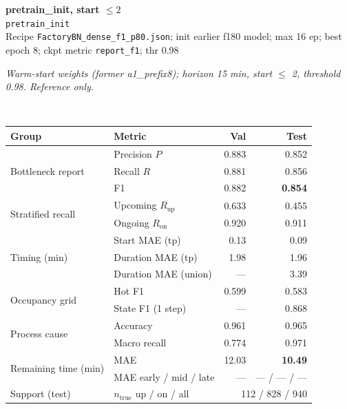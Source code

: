 \documentclass[9pt,a4paper,twocolumn]{extarticle}
\begin{document}
\noindent\begin{minipage}{\columnwidth}
\begin{center}
{\small\bfseries pretrain\_init, start $\le 2$}\\
{\scriptsize\texttt{pretrain\_init}}\\
{\scriptsize Recipe \texttt{FactoryBN\_dense\_f1\_p80.json}; init earlier f180 model; max 16 ep; best epoch 8; ckpt metric \texttt{report\_f1}; thr 0.98}\\[1pt]
\parbox{0.96\columnwidth}{\scriptsize\itshape Warm-start weights (former a1\_prefix8); horizon 15 min, start $\le$ 2, threshold 0.98. Reference only.}\\[2pt]
\scriptsize\setlength{\tabcolsep}{3pt}
\begin{tabular}{llrr}
\toprule
Group & Metric & Val & Test \\
\midrule
\multirow{3}{*}{Bottleneck report}
  & Precision $P$ & 0.883 & 0.852 \\
  & Recall $R$ & 0.881 & 0.856 \\
  & F1 & 0.882 & \textbf{0.854} \\
\midrule
\multirow{2}{*}{Stratified recall}
  & Upcoming $R_{\mathrm{up}}$ & 0.633 & 0.455 \\
  & Ongoing $R_{\mathrm{on}}$ & 0.920 & 0.911 \\
\midrule
\multirow{3}{*}{Timing (min)}
  & Start MAE (tp) & 0.13 & 0.09 \\
  & Duration MAE (tp) & 1.98 & 1.96 \\
  & Duration MAE (union) & --- & 3.39 \\
\midrule
\multirow{2}{*}{Occupancy grid}
  & Hot F1 & 0.599 & 0.583 \\
  & State F1 (1 step) & --- & 0.868 \\
\midrule
\multirow{2}{*}{Process cause}
  & Accuracy & 0.961 & 0.965 \\
  & Macro recall & 0.774 & 0.971 \\
\midrule
\multirow{2}{*}{Remaining time (min)}
  & MAE & 12.03 & \textbf{10.49} \\
  & MAE early / mid / late & --- & --- / --- / --- \\
\midrule
Support (test)
  & $n_{\mathrm{true}}$ up / on / all & \multicolumn{2}{r}{112 / 828 / 940} \\
\bottomrule
\end{tabular}
\end{center}
\end{minipage}\par\vspace{6pt}
\end{document}
